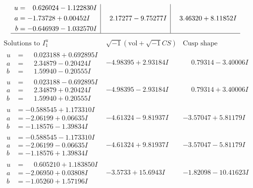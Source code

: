 \documentclass[1p]{elsarticle_modified}
\theoremstyle{definition}
\newcommand{\I}{\sqrt{-1}}
\begin{document}
$$\begin{array}{c|c|c}
\begin{aligned}
u &= \phantom{-}0.626024 - 1.122830 I \\
a &= -1.73728 + 0.00452 I \\
b &= -0.646939 - 1.032570 I\end{aligned}
 & \phantom{-}2.17277 - 9.75277 I & \phantom{-}3.46320 + 8.11852 I\\
 \hline 
 \end{array}$$\newpage$$\begin{array}{c|c|c}  
\text{Solutions to }I^u_{1}& \I (\text{vol} + \sqrt{-1}CS) & \text{Cusp shape}\\
 \hline 
\begin{aligned}
u &= \phantom{-}0.023188 + 0.692895 I \\
a &= \phantom{-}2.34879 - 0.20424 I \\
b &= \phantom{-}1.59940 - 0.20555 I\end{aligned}
 & -4.98395 + 2.93184 I & \phantom{-}0.79314 - 3.40006 I \\ \hline\begin{aligned}
u &= \phantom{-}0.023188 - 0.692895 I \\
a &= \phantom{-}2.34879 + 0.20424 I \\
b &= \phantom{-}1.59940 + 0.20555 I\end{aligned}
 & -4.98395 - 2.93184 I & \phantom{-}0.79314 + 3.40006 I \\ \hline\begin{aligned}
u &= -0.588545 + 1.173310 I \\
a &= -2.06199 + 0.06635 I \\
b &= -1.18576 - 1.39834 I\end{aligned}
 & -4.61324 - 9.81937 I & -3.57047 + 5.81179 I \\ \hline\begin{aligned}
u &= -0.588545 - 1.173310 I \\
a &= -2.06199 - 0.06635 I \\
b &= -1.18576 + 1.39834 I\end{aligned}
 & -4.61324 + 9.81937 I & -3.57047 - 5.81179 I \\ \hline\begin{aligned}
u &= \phantom{-}0.605210 + 1.183850 I \\
a &= -2.06950 + 0.03808 I \\
b &= -1.05260 + 1.57196 I\end{aligned}
 & -3.5733 + 15.6943 I & -1.82098 - 10.41623 I \\ \hline\begin{aligned}

\end{aligned}
\end{array}$$
\end{document}
